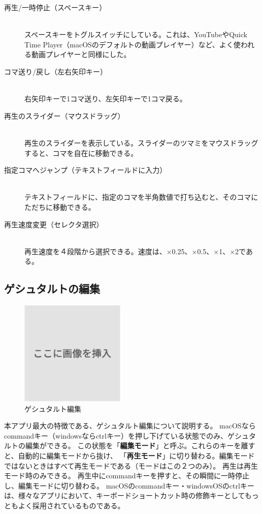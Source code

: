\begin{description}
  \item [再生/一時停止（スペースキー）]\mbox{}\\
  スペースキーをトグルスイッチにしている。これは、YouTubeやQuick Time Player（macOSのデフォルトの動画プレイヤー）など、よく使われる動画プレイヤーと同様にした。
  \item [コマ送り/戻し（左右矢印キー）]\mbox{}\\
  右矢印キーで1コマ送り、左矢印キーで1コマ戻る。
  \item [再生のスライダー（マウスドラッグ）]\mbox{}\\
  再生のスライダーを表示している。スライダーのツマミをマウスドラッグすると、コマを自在に移動できる。
  \item [指定コマへジャンプ（テキストフィールドに入力）]\mbox{}\\
  テキストフィールドに、指定のコマを半角数値で打ち込むと、そのコマにただちに移動できる。
  \item [再生速度変更（セレクタ選択）]\mbox{}\\
  再生速度を４段階から選択できる。速度は、×0.25、×0.5、×1、×2である。
\end{description}



\subsection{ゲシュタルトの編集}
\begin{figure}[h]
  \centering
  \includegraphics[width=5cm]{images/dummy.png}
  \caption{ゲシュタルト編集}
  \label{fig:ゲシュタルト編集}
\end{figure}
本アプリ最大の特徴である、ゲシュタルト編集について説明する。
macOSならcommandキー（windowsならctrlキー）を押し下げている状態でのみ、ゲシュタルトの編集ができる。
この状態を「\textbf{編集モード}」と呼ぶ。これらのキーを離すと、自動的に編集モードから抜け、
「\textbf{再生モード}」に切り替わる。編集モードではないときはすべて再生モードである（モードはこの２つのみ）。
再生は再生モード時のみできる。
再生中にcommandキーを押すと、その瞬間に一時停止し、編集モードに切り替わる。
macOSのcommandキー・windowsOSのctrlキーは、様々なアプリにおいて、キーボードショートカット時の修飾キーとしてもっともよく採用されているものである。

